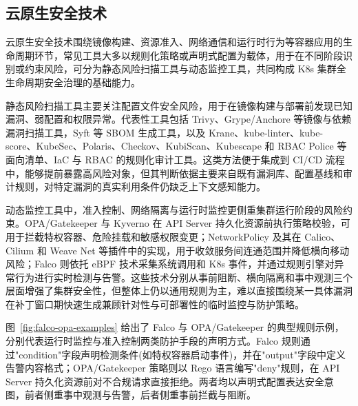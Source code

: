 \subsection{云原生安全技术}

云原生安全技术围绕镜像构建、资源准入、网络通信和运行时行为等容器应用的生命周期环节，常见工具大多以规则化策略或声明式配置为载体，用于在不同阶段识别或约束风险，可分为静态风险扫描工具与动态监控工具，共同构成 K8s 集群全生命周期安全治理的基础能力。

静态风险扫描工具主要关注配置文件安全风险，用于在镜像构建与部署前发现已知漏洞、弱配置和权限异常。代表性工具包括 Trivy\cite{trivy2025}、Grype/Anchore\cite{grype2025} 等镜像与依赖漏洞扫描工具，Syft\cite{syft2025} 等 SBOM 生成工具，以及 Krane\cite{krane2024}、kube-linter\cite{kubelinter2025}、kube-score\cite{kubescore2025}、KubeSec\cite{kubesec2025}、Polaris\cite{polaris2025}、Checkov\cite{checkov2025}、KubiScan\cite{kubiscan2024}、Kubescape\cite{kubescape2025} 和 RBAC Police\cite{paloalto2024} 等面向清单、IaC 与 RBAC 的规则化审计工具。这类方法便于集成到 CI/CD 流程中，能够提前暴露高风险对象，但其判断依据主要来自既有漏洞库、配置基线和审计规则，对特定漏洞的真实利用条件仍缺乏上下文感知能力。

动态监控工具中，准入控制、网络隔离与运行时监控更侧重集群运行阶段的风险约束。OPA/Gatekeeper\cite{opa2025} 与 Kyverno\cite{kyverno2025} 在 API Server 持久化资源前执行策略校验，可用于拦截特权容器、危险挂载和敏感权限变更；NetworkPolicy 及其在 Calico、Cilium 和 Weave Net 等插件中的实现，用于收敛服务间连通范围并降低横向移动风险；Falco\cite{falco2025} 则依托 eBPF 技术\cite{hoiland2018express}采集系统调用和 K8s 事件，并通过规则引擎对异常行为进行实时检测与告警。这些技术分别从事前阻断、横向隔离和事中观测三个层面增强了集群安全性，但整体上仍以通用规则为主，难以直接围绕某一具体漏洞在补丁窗口期快速生成兼顾针对性与可部署性的临时监控与防护策略。

图~\ref{fig:falco-opa-examples} 给出了 Falco 与 OPA/Gatekeeper 的典型规则示例，分别代表运行时监控与准入控制两类防护手段的声明方式。Falco 规则通过"condition"字段声明检测条件(如特权容器启动事件)，并在"output"字段中定义告警内容格式；OPA/Gatekeeper 策略则以 Rego 语言编写"deny"规则，在 API Server 持久化资源前对不合规请求直接拒绝。两者均以声明式配置表达安全意图，前者侧重事中观测与告警，后者侧重事前拦截与阻断。

